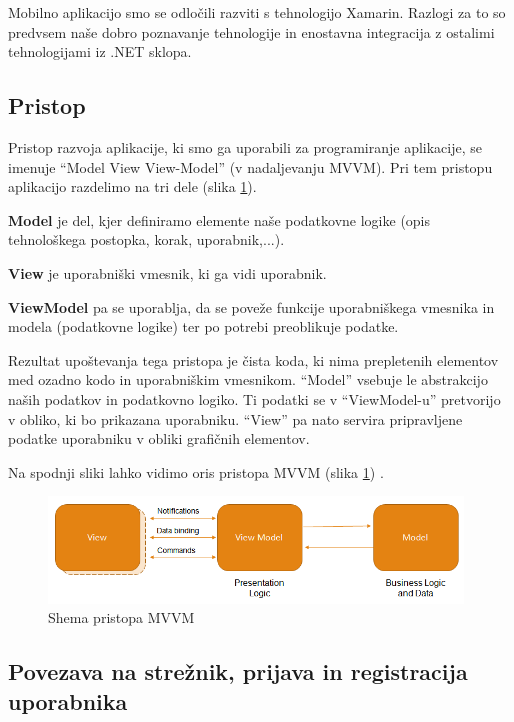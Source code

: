 \documentclass[a4paper, 12pt]{book}
\begin{document}
Mobilno aplikacijo smo se odločili razviti s tehnologijo Xamarin.
Razlogi za to so predvsem naše dobro poznavanje tehnologije in enostavna integracija z ostalimi tehnologijami iz .NET sklopa.


\subsection{Pristop}
Pristop razvoja aplikacije, ki smo ga uporabili za programiranje aplikacije, se imenuje \enquote{Model View View-Model} (v nadaljevanju MVVM).
Pri tem pristopu aplikacijo razdelimo na tri dele (slika \ref{mvvm}).

\textbf{Model} je del, kjer definiramo elemente naše podatkovne logike (opis tehnološkega postopka, korak, uporabnik,...).

\textbf{View} je uporabniški vmesnik, ki ga vidi uporabnik.

\textbf{ViewModel} pa se uporablja, da se poveže funkcije uporabniškega vmesnika in modela (podatkovne logike) ter po potrebi preoblikuje podatke.

Rezultat upoštevanja tega pristopa je čista koda, ki nima prepletenih elementov med ozadno kodo in uporabniškim vmesnikom.
\enquote{Model} vsebuje le abstrakcijo naših podatkov in podatkovno logiko.
Ti podatki se v \enquote{ViewModel-u} pretvorijo v obliko, ki bo prikazana uporabniku.
\enquote{View} pa nato servira pripravljene podatke uporabniku v obliki grafičnih elementov.

Na spodnji sliki lahko vidimo oris pristopa MVVM (slika \ref{mvvm}) \cite{mvvmimage}.

\begin{figure}[H]
\begin{center}
\includegraphics[width=11cm]{mvvm}
\end{center}
	\caption{Shema pristopa MVVM}
\label{mvvm}
\end{figure}

\subsection{Povezava na strežnik, prijava in registracija uporabnika}
\end{document}
